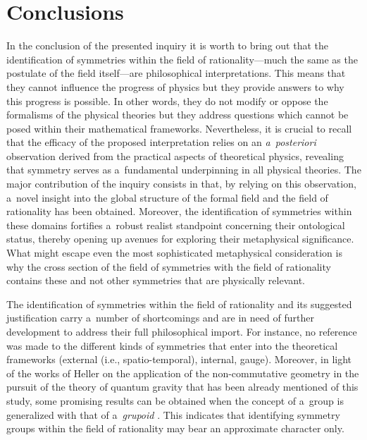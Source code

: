 \section{Conclusions}

In the conclusion of the presented inquiry it is worth to bring out that the identification of symmetries within the field of rationality---much the same as the postulate of the field itself---are philosophical interpretations. This means that they cannot influence the progress of physics but they provide answers to why this progress is possible. In other words, they do not modify or oppose the formalisms of the physical theories but they address questions which cannot be posed within their mathematical frameworks. Nevertheless, it is crucial to recall that the efficacy of the proposed interpretation relies on an \textit{a~posteriori} observation derived from the practical aspects of theoretical physics, revealing that symmetry serves as a~fundamental underpinning in all physical theories. The major contribution of the inquiry consists in that, by relying on this observation, a~novel insight into the global structure of the formal field and the field of rationality has been obtained. Moreover, the identification of symmetries within these domains fortifies a~robust realist standpoint concerning their ontological status, thereby opening up avenues for exploring their metaphysical significance. What might escape even the most sophisticated metaphysical consideration is why the cross section of the field of symmetries with the field of rationality contains these and not other symmetries that are physically relevant.



The identification of symmetries within the field of rationality and its suggested justification carry a~number of shortcomings and are in need of further development to address their full philosophical import. For instance, no reference was made to the different kinds of symmetries that enter into the theoretical frameworks (external (i.e., spatio-temporal), internal, gauge). Moreover, in light of the works of Heller on the application of the non-commutative geometry in the pursuit of the theory of quantum gravity that has been already mentioned of this study, some promising results can be obtained when the concept of a~group is generalized with that of a~\textit{grupoid} 
\parencite[e.g][]{heller_evolution_2006}. %
 This indicates that identifying symmetry groups within the field of rationality may bear an approximate character only.



